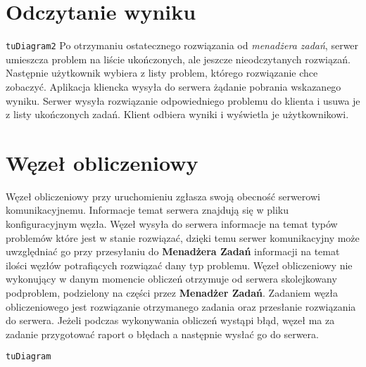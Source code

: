 \documentclass[12pt,a4paper,titlepage]{report}
\begin{document}
		\section{Odczytanie wyniku}
		\verb+tuDiagram2+
		Po otrzymaniu ostatecznego rozwiązania od \textit{menadżera zadań}, serwer umieszcza problem na liście ukończonych, ale jeszcze nieodczytanych rozwiązań. Następnie użytkownik wybiera z listy problem, którego rozwiązanie chce zobaczyć. Aplikacja kliencka wysyła do serwera żądanie pobrania wskazanego wyniku. Serwer wysyła rozwiązanie odpowiedniego problemu do klienta i usuwa je z listy ukończonych zadań. Klient odbiera wyniki i wyświetla je użytkownikowi.
		\section{Węzeł obliczeniowy}
		Węzeł obliczeniowy przy uruchomieniu zgłasza swoją obecność serwerowi komunikacyjnemu. Informacje temat serwera 
znajdują się w pliku konfiguracyjnym węzła. Węzeł wysyła do serwera informacje na temat typów problemów które jest w stanie 
rozwiązać, dzięki temu serwer komunikacyjny może uwzględniać go przy przesyłaniu do \textbf{Menadżera Zadań} informacji na temat
ilości węzłów potrafiących rozwiązać dany typ problemu. \linebreak
Węzeł obliczeniowy nie wykonujący w danym momencie obliczeń otrzymuje od serwera skolejkowany podproblem, podzielony 
na części przez \textbf{Menadżer Zadań}. Zadaniem węzła obliczeniowego jest rozwiązanie otrzymanego zadania oraz przesłanie
rozwiązania do serwera. Jeżeli podczas wykonywania obliczeń wystąpi błąd, węzeł ma za zadanie przygotować raport o 
błędach a następnie wysłać go do serwera.

\verb+tuDiagram+
\end{document}
